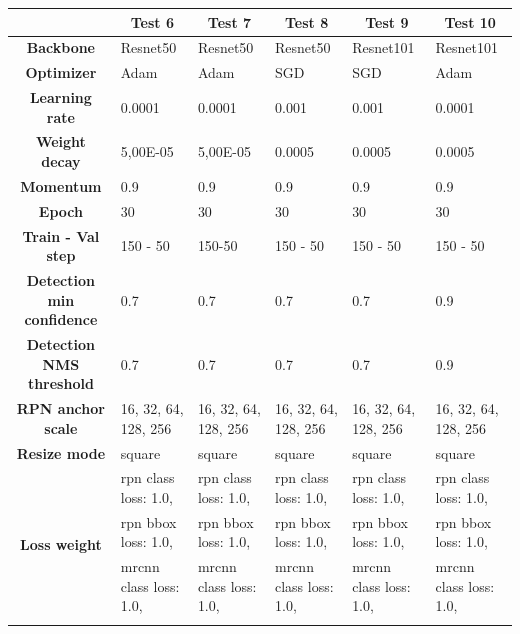 	
	\begin{longtable}[c]{|c|l|l|l|l|l|}
		\hline
		& \multicolumn{1}{c|}{\textbf{Test 6}} & \multicolumn{1}{c|}{\textbf{Test 7}} & \multicolumn{1}{c|}{\textbf{Test 8}} & \multicolumn{1}{c|}{\textbf{Test 9}} & \multicolumn{1}{c|}{\textbf{Test 10}} \\ \hline
		\endhead
		\textbf{Backbone} & Resnet50 & Resnet50 & Resnet50 & Resnet101 & Resnet101 \\ \hline
		\textbf{Optimizer} & Adam & Adam & SGD & SGD & Adam \\ \hline
		\textbf{Learning rate} & 0.0001 & 0.0001 & 0.001 & 0.001 & 0.0001 \\ \hline
		\textbf{Weight decay} & 5,00E-05 & 5,00E-05 & 0.0005 & 0.0005 & 0.0005 \\ \hline
		\textbf{Momentum} & 0.9 & 0.9 & 0.9 & 0.9 & 0.9 \\ \hline
		\textbf{Epoch} & 30 & 30 & 30 & 30 & 30 \\ \hline
		\textbf{Train - Val step} & 150 - 50 & 150-50 & 150 - 50 & 150 - 50 & 150 - 50 \\ \hline
		\textbf{Detection min confidence} & 0.7 & 0.7 & 0.7 & 0.7 & 0.9 \\ \hline
		\textbf{Detection NMS threshold} & 0.7 & 0.7 & 0.7 & 0.7 & 0.9 \\ \hline
		\multirow{2}{*}{\textbf{RPN anchor scale}} & \multirow{2}{*}{16, 32, 64, 128, 256} & \multirow{2}{*}{16, 32, 64, 128, 256} & \multirow{2}{*}{16, 32, 64, 128, 256} & \multirow{2}{*}{16, 32, 64, 128, 256} & \multirow{2}{*}{16, 32, 64, 128, 256} \\
		&  &  &  &  &  \\ \hline
		\textbf{Resize mode} & square & square & square & square & square \\ \hline
		\multirow{6}{*}{\textbf{Loss weight}} & rpn class loss: 1.0, & rpn class loss: 1.0, & rpn class loss: 1.0, & rpn class loss: 1.0, & rpn class loss: 1.0, \\ \cline{2-6} 
		& rpn bbox loss: 1.0, & rpn bbox loss: 1.0, & rpn bbox loss: 1.0, & rpn bbox loss: 1.0, & rpn bbox loss: 1.0, \\ \cline{2-6} 
		& mrcnn class loss: 1.0, & mrcnn class loss: 1.0, & mrcnn class loss: 1.0, & mrcnn class loss: 1.0, & mrcnn class loss: 1.0, \\ \cline{2-6} 

\end{longtable}
